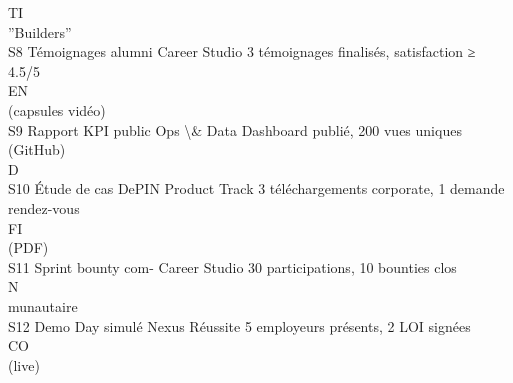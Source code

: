 \vspace{0.5em}
\vspace{0.5em}
\vspace{0.5em}
\vspace{0.5em}
TI\\
”Builders”\\
S8         Témoignages alumni Career Studio           3 témoignages finalisés, satisfaction ≥ 4.5/5\\
\vspace{0.5em}
\vspace{0.5em}
\vspace{0.5em}
\vspace{0.5em}
EN\\
(capsules vidéo)\\
S9         Rapport KPI public Ops \textbackslash{}& Data              Dashboard publié, 200 vues uniques\\
(GitHub)\\
\vspace{0.5em}
\vspace{0.5em}
\vspace{0.5em}
\vspace{0.5em}
D\\
S10        Étude de cas DePIN Product Track           3 téléchargements corporate, 1 demande rendez-vous\\
\vspace{0.5em}
\vspace{0.5em}
\vspace{0.5em}
\vspace{0.5em}
FI\\
(PDF)\\
S11        Sprint bounty com- Career Studio           30 participations, 10 bounties clos\\
\vspace{0.5em}
\vspace{0.5em}
\vspace{0.5em}
N\\
munautaire\\
S12        Demo Day simulé Nexus Réussite             5 employeurs présents, 2 LOI signées\\
CO\\
(live)\\
\vspace{0.5em}
\vspace{0.5em}
\vspace{0.5em}
\vspace{0.5em}
